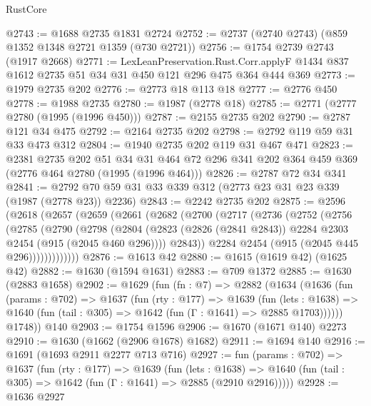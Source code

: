 \begin{lexlean}{RustCore}
\begin{coremodule}
@2743 := @1688 @2735 @1831 @2724
@2752 := @2737 (@2740 @2743) (@859 @1352 @1348 @2721 @1359 (@730 @2721))
@2756 := @1754 @2739 @2743 (@1917 @2668)
@2771 := LexLeanPreservation.Rust.Corr.applyF
    @1434
    @837
    @1612
    @2735
    @51
    @34
    @31
    @450
    @121
    @296
    @475
    @364
    @444
    @369
@2773 := @1979 @2735 @202
@2776 := @2773 @18 @113 @18
@2777 := @2776 @450
@2778 := @1988 @2735
@2780 := @1987 (@2778 @18)
@2785 := @2771 (@2777 @2780 (@1995 (@1996 @450)))
@2787 := @2155 @2735 @202
@2790 := @2787 @121 @34 @475
@2792 := @2164 @2735 @202
@2798 := @2792 @119 @59 @31 @33 @473 @312
@2804 := @1940 @2735 @202 @119 @31 @467 @471
@2823 := @2381
    @2735
    @202
    @51
    @34
    @31
    @464
    @72
    @296
    @341
    @202
    @364
    @459
    @369
    (@2776 @464 @2780 (@1995 (@1996 @464)))
@2826 := @2787 @72 @34 @341
@2841 := @2792 @70 @59 @31 @33 @339 @312 (@2773 @23 @31 @23 @339 (@1987 (@2778 @23)) @2236)
@2843 := @2242 @2735 @202
@2875 := @2596
    (@2618
      (@2657
        (@2659
          (@2661
            (@2682
              (@2700
                (@2717
                  (@2736
                    (@2752
                      (@2756
                        (@2785
                          (@2790
                            (@2798
                              (@2804
                                (@2823
                                  (@2826 (@2841 @2843))
                                  @2284
                                  @2303
                                  @2454
                                  (@915 (@2045 @460 @296))))
                              @2843))
                          @2284
                          @2454
                          (@915 (@2045 @445 @296)))))))))))))
@2876 := @1613 @42
@2880 := @1615 (@1619 @42) (@1625 @42)
@2882 := @1630 (@1594 @1631)
@2883 := @709 @1372
@2885 := @1630 (@2883 @1658)
@2902 := @1629
    (fun (fn : @7) =>
    @2882
      (@1634
        (@1636
          (fun (params : @702) =>
          @1637
            (fun (rty : @177) =>
            @1639
              (fun (lets : @1638) =>
              @1640 (fun (tail : @305) => @1642 (fun (Γ : @1641) => @2885 @1703))))))
        @1748))
    @140
@2903 := @1754 @1596
@2906 := @1670 (@1671 @140) @2273
@2910 := @1630 (@1662 (@2906 @1678) @1682)
@2911 := @1694 @140
@2916 := @1691 (@1693 @2911 @2277 @713 @716)
@2927 := fun (params : @702) =>
  @1637
    (fun (rty : @177) =>
    @1639
      (fun (lets : @1638) =>
      @1640 (fun (tail : @305) => @1642 (fun (Γ : @1641) => @2885 (@2910 @2916)))))
@2928 := @1636 @2927

\end{coremodule}
\end{lexlean}
